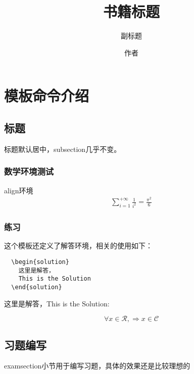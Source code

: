 \documentclass[zihao=-4, twoside]{ctexbook}
\begin{document}
\title{书籍标题}
\subtitle{副标题}
\author{作者}
\makecover
\tableofcontents
\newpage
{}
\chapter{模板命令介绍}

\newpage
{}  %
\section{标题}
标题默认居中，subsection几乎不变。



\subsection{数学环境测试}
align环境
\begin{align}
  \sum_{i=1}^{+\infty}{\frac{1}{i^2}} = \frac{\pi^2}{6}
\end{align}

\subsection{练习}

这个模板还定义了解答环境，相关的使用如下：

\begin{verbatim}
  \begin{solution}
    这里是解答，
    This is the Solution
  \end{solution}
\end{verbatim}

\begin{solution}
  这里是解答，This is the Solution:

  \[
    \forall x \in \mathcal{R}, \Rightarrow x \in \mathcal{C}  
  \]
\end{solution}


\newpage
\section{习题编写}

\examsection

examsection小节用于编写习题，具体的效果还是比较理想的
\end{document}
